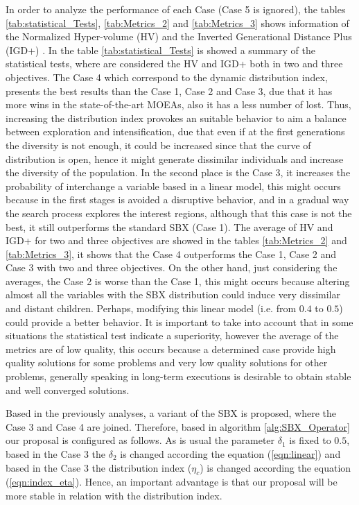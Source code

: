 In order to analyze the performance of each Case (Case 5 is ignored), the tables \ref{tab:statistical_Tests}, \ref{tab:Metrics_2} and \ref{tab:Metrics_3} shows information of the Normalized Hyper-volume (HV) \cite{zitzler1999multiobjective} and the Inverted Generational Distance Plus (IGD+) \cite{Joel:IGDPlus_And_GDPlus}.
%
In the table \ref{tab:statistical_Tests} is showed a summary of the statistical tests, where are considered the HV and IGD+ both in two and three objectives.
%
The Case 4 which correspond to the dynamic distribution index, presents the best results than the Case 1, Case 2 and Case 3, due that it has more wins in the state-of-the-art MOEAs, also it has a less number of lost.
%
Thus, increasing the distribution index provokes an suitable behavior to aim a balance between exploration and intensification, due that even if at the first generations the diversity is not enough, it could be increased since that the curve of distribution is open, hence it might generate dissimilar individuals and increase the diversity of the population.
%
In the second place is the Case 3, it increases the probability of interchange a variable based in a linear model, this might occurs because in the first stages is avoided a disruptive behavior, and in a gradual way the search process explores the interest regions, although that this case is not the best, it still outperforms the standard SBX (Case 1).
%
%
The average of HV and IGD+ for two and three objectives are showed in the tables \ref{tab:Metrics_2} and \ref{tab:Metrics_3}, it shows that the Case 4 outperforms the Case 1, Case 2 and Case 3 with two and three objectives.
%
On the other hand, just considering the averages, the Case 2 is worse than the Case 1, this might occurs because altering almost all the variables with the SBX distribution could induce very dissimilar and distant children.
%
Perhaps, modifying this linear model (i.e. from $0.4$ to $0.5$) could provide a better behavior.
%
It is important to take into account that in some situations the statistical test indicate a superiority, however the average of the metrics are of low quality, this occurs because a determined case provide high quality solutions for some problems and very low quality solutions for other problems, generally speaking in long-term executions is desirable to obtain stable and well converged solutions.
%

Based in the previously analyses, a variant of the SBX is proposed, where the Case 3 and Case 4 are joined.
%
Therefore, based in algorithm \ref{alg:SBX_Operator} our proposal is configured as follows.
%
As is usual the parameter $\delta_1$ is fixed to $0.5$, based in the Case 3 the $\delta_2$ is changed according the equation (\ref{eqn:linear}) and based in the Case 3 the distribution index ($\eta_c$) is changed according the equation (\ref{eqn:index_eta}).
%
Hence, an important advantage is that our proposal will be more stable in relation with the distribution index.





